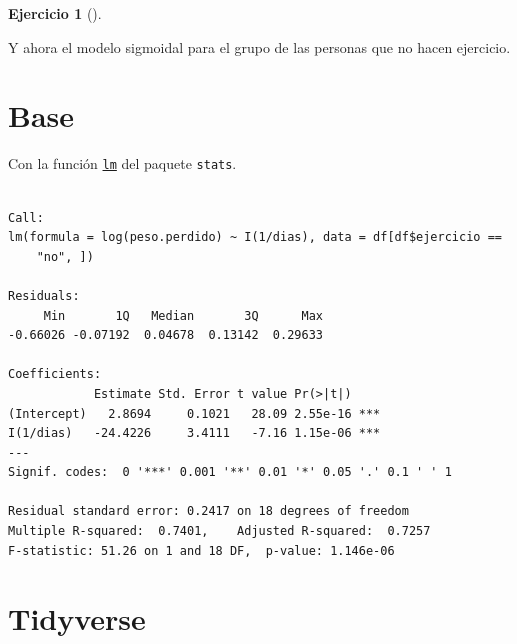 \documentclass[
  a4paper,
]{scrreport}
\newenvironment{Shaded}{\begin{snugshade}}{\end{snugshade}}
\newcommand{\DecValTok}[1]{\textcolor[rgb]{0.68,0.00,0.00}{#1}}
\newcommand{\FunctionTok}[1]{\textcolor[rgb]{0.28,0.35,0.67}{#1}}
\newcommand{\NormalTok}[1]{\textcolor[rgb]{0.00,0.23,0.31}{#1}}
\newcommand{\OtherTok}[1]{\textcolor[rgb]{0.00,0.23,0.31}{#1}}
\newcommand{\SpecialCharTok}[1]{\textcolor[rgb]{0.37,0.37,0.37}{#1}}
\newcommand{\StringTok}[1]{\textcolor[rgb]{0.13,0.47,0.30}{#1}}
\theoremstyle{definition}
\newtheorem{exercise}{Ejercicio}[chapter]
\theoremstyle{remark}
\begin{document}
\begin{exercise}[]
\begin{enumerate}
\begin{tcolorbox}
  Y ahora el modelo sigmoidal para el grupo de las personas que no hacen
  ejercicio.

  \section{Base}

  Con la función
  \href{https://www.rdocumentation.org/packages/stats/versions/3.6.2/topics/lm}{\texttt{lm}}
  del paquete \texttt{stats}.

\begin{Shaded}
\end{Shaded}

\begin{verbatim}

Call:
lm(formula = log(peso.perdido) ~ I(1/dias), data = df[df$ejercicio == 
    "no", ])

Residuals:
     Min       1Q   Median       3Q      Max 
-0.66026 -0.07192  0.04678  0.13142  0.29633 

Coefficients:
            Estimate Std. Error t value Pr(>|t|)    
(Intercept)   2.8694     0.1021   28.09 2.55e-16 ***
I(1/dias)   -24.4226     3.4111   -7.16 1.15e-06 ***
---
Signif. codes:  0 '***' 0.001 '**' 0.01 '*' 0.05 '.' 0.1 ' ' 1

Residual standard error: 0.2417 on 18 degrees of freedom
Multiple R-squared:  0.7401,    Adjusted R-squared:  0.7257 
F-statistic: 51.26 on 1 and 18 DF,  p-value: 1.146e-06
\end{verbatim}

  \section{Tidyverse}


\end{tcolorbox}
\end{enumerate}
\end{exercise}
\end{document}
